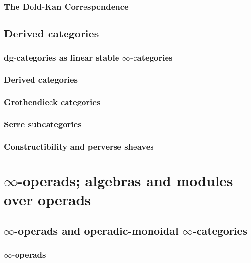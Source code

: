        \subsubsection{The Dold-Kan Correspondence}
        
    \subsection{Derived categories}
        \subsubsection{dg-categories as linear stable \texorpdfstring{$\infty$}{}-categories}
        
        \subsubsection{Derived categories}
        
        \subsubsection{Grothendieck categories}
        
        \subsubsection{Serre subcategories}
    
        \subsubsection{Constructibility and perverse sheaves}

\section{\texorpdfstring{$\infty$}{}-operads; algebras and modules over operads} \label{section: algebras_and_modules_over_operads}
    \subsection{\texorpdfstring{$\infty$}{}-operads and operadic-monoidal \texorpdfstring{$\infty$}{}-categories} \label{subsection: operads}
        \subsubsection{\texorpdfstring{$\infty$}{}-operads}
        
